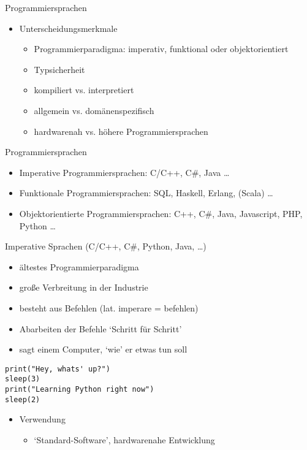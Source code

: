 \begin{frame}{Programmiersprachen}
    \begin{itemize}
        \item Unterscheidungsmerkmale
            \begin{itemize}
                \item Programmierparadigma: imperativ, funktional oder objektorientiert
                \item Typsicherheit
                \item kompiliert vs. interpretiert
                \item allgemein vs. domänenspezifisch
                \item hardwarenah vs. höhere Programmiersprachen
            \end{itemize}
    \end{itemize}
\end{frame}

\begin{frame}[fragile]{Programmiersprachen}
    \begin{itemize}
        \item Imperative Programmiersprachen: C/C++, C\#, Java \dots
        \item Funktionale Programmiersprachen: SQL, Haskell, Erlang, (Scala) \dots
        \item Objektorientierte Programmiersprachen: C++, C\#, Java, Javascript, PHP, Python \dots
    \end{itemize}
\end{frame}

\begin{frame}[fragile]{Imperative Sprachen (C/C++, C\#, Python, Java, \dots)}
    \begin{itemize}
        \item ältestes Programmierparadigma
        \item große Verbreitung in der Industrie
        \item besteht aus Befehlen (lat. imperare = befehlen)
        \item Abarbeiten der Befehle `Schritt für Schritt'
        \item sagt einem Computer, `wie' er etwas tun soll
    \end{itemize}
    \begin{lstlisting}
print("Hey, whats' up?")
sleep(3)
print("Learning Python right now")
sleep(2)
    \end{lstlisting}
    \begin{itemize}
        \item Verwendung
            \begin{itemize}
                \item `Standard-Software', hardwarenahe Entwicklung
            \end{itemize}
    \end{itemize}
\end{frame}

